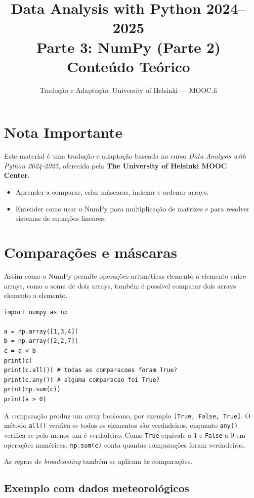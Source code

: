 \documentclass[11pt,a4paper]{article}
\title{\textbf{Data Analysis with Python 2024--2025}\\Parte 3: NumPy (Parte 2)\\\large Conteúdo Teórico}
\author{Tradução e Adaptação: University of Helsinki --- MOOC.fi}
\date{}
\begin{document}
\maketitle

\section*{Nota Importante}
Este material é uma tradução e adaptação baseada no curso \textit{Data Analysis with Python 2024-2025}, oferecido pela \textbf{The University of Helsinki MOOC Center}.

\begin{objetivos}
\begin{itemize}
    \item Aprender a comparar, criar máscaras, indexar e ordenar arrays.
    \item Entender como usar o NumPy para multiplicação de matrizes e para resolver sistemas de equações lineares.
\end{itemize}
\end{objetivos}

\tableofcontents
\newpage

\section{Comparações e máscaras}

Assim como o NumPy permite operações aritméticas elemento a elemento entre arrays, como a soma de dois arrays, também é possível comparar dois arrays elemento a elemento.

\begin{lstlisting}
import numpy as np

a = np.array([1,3,4])
b = np.array([2,2,7])
c = a < b
print(c)
print(c.all()) # todas as comparacoes foram True?
print(c.any()) # alguma comparacao foi True?
print(np.sum(c))
print(a > 0)
\end{lstlisting}

A comparação produz um array booleano, por exemplo \texttt{[True, False, True]}. O método \texttt{all()} verifica se todos os elementos são verdadeiros, enquanto \texttt{any()} verifica se pelo menos um é verdadeiro. Como \texttt{True} equivale a 1 e \texttt{False} a 0 em operações numéricas, \texttt{np.sum(c)} conta quantas comparações foram verdadeiras.

As regras de \textit{broadcasting} também se aplicam às comparações.

\subsection{Exemplo com dados meteorológicos}
\end{document}
